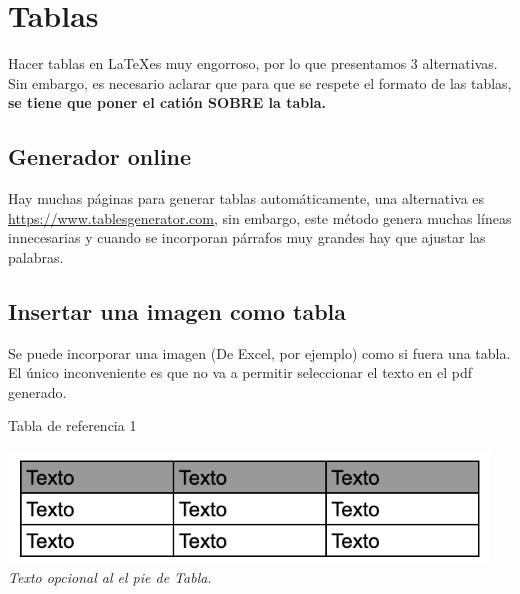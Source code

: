 \begin{figure}[b]
\end{figure}

\newpage

\section{Tablas}

Hacer tablas en \LaTeX es muy engorroso, por lo que presentamos 3 alternativas. Sin embargo, es necesario aclarar que para que se respete el formato de las tablas, \textbf{se tiene que poner el catión SOBRE la tabla.}

\subsection{Generador online}
Hay muchas páginas para generar tablas automáticamente, una alternativa es \href{tablesgenerator}{https://www.tablesgenerator.com}, sin embargo, este método genera muchas líneas innecesarias y cuando se incorporan párrafos muy grandes hay que ajustar las palabras.

\subsection{Insertar una imagen como tabla}
Se puede incorporar una imagen (De Excel, por ejemplo) como si fuera una tabla. El único inconveniente es que no va a permitir seleccionar el texto en el pdf generado.
\begin{table}[H]
    \centering
    \caption{Tabla de referencia 1}
    \includegraphics[height=3cm]{img/tablaejemplo.png} 
    \\ \textit{\scriptsize{Texto opcional al el pie de Tabla.}}
    \label{img:referencia3}
\end{table}


